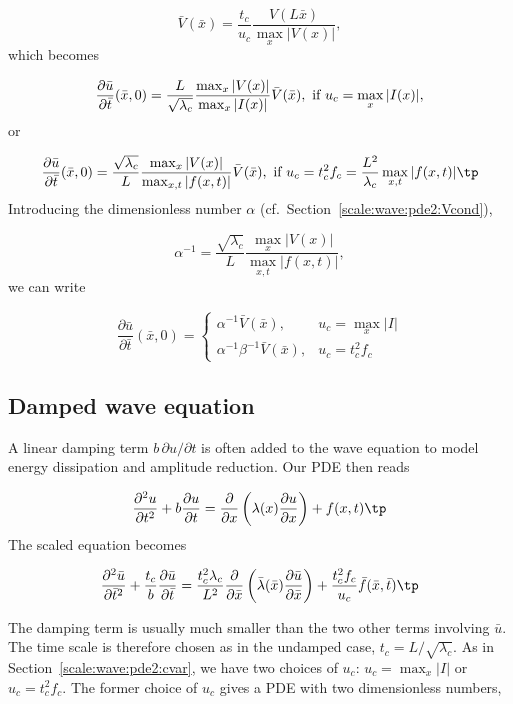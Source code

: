 \documentclass[graybox,envcountchap,sectrefs,final]{svmonodo}
\begin{document}
\[ \bar V(\bar x) = \frac{t_c}{u_c}\frac{V(L\bar x)}{\max_x|V(x)|},\]
which becomes

\[ \frac{\partial\bar u}{\partial\bar t}(\bar x, 0) =
\frac{L}{\sqrt{\lambda_c}}\frac{\max_{x}|V(x)|}{\max_{x}|I(x)|}\bar V(\bar x),
\hbox{ if } u_c=\max_x|I(x)|,\]
or

\[ \frac{\partial\bar u}{\partial\bar t}(\bar x, 0) =
\frac{\sqrt{\lambda_c}}{L}\frac{\max_{x}|V(x)|}{\max_{x,t}|f(x,t)|}
\bar V(\bar x),
\hbox{ if } u_c=t_c^2f_c=\frac{L^2}{\lambda_c}\max_{x,t}|f(x,t)|\tp\]
Introducing the dimensionless number $\alpha$ (cf.~Section~\ref{scale:wave:pde2:Vcond}),

\[ \alpha^{-1} = \frac{\sqrt{\lambda_c}}{L}\frac{\max_{x}|V(x)|}{\max_{x,t}|f(x,t)|},
\]
we can write

\[
\frac{\partial\bar u}{\partial\bar t}(\bar x, 0) =
\left\lbrace \begin{array}{ll}
\alpha^{-1}\bar V(\bar x),& u_c=\max_x|I|\\ 
\alpha^{-1}\beta^{-1}\bar V(\bar x), & u_c=t_c^2f_c
\end{array}\right.
\]

\subsection{Damped wave equation}
\label{scale:wave:pde2:damped}

A linear damping term $b\,\partial u/\partial t$ is often added to
the wave equation to model energy dissipation and amplitude reduction.
Our PDE then reads

\begin{equation}
\frac{\partial^2 u}{\partial t^2}
+ b\frac{\partial u}{\partial t} =
\frac{\partial}{\partial x}\left(
\lambda(x) {\partial u\over\partial x}\right) + f(x,t)\tp
\end{equation}
The scaled equation becomes

\[
\frac{\partial^2 \bar u}{\partial \bar t^2}
+ \frac{t_c} b\frac{\partial \bar u}{\partial \bar t} =
\frac{t_c^2\lambda_c}{L^2}\frac{\partial}{\partial \bar x}\left(
\bar \lambda(\bar x) {\partial \bar u\over\partial \bar x}\right) +
\frac{t_c^2f_c}{u_c}\bar f(\bar x,\bar t)\tp
\]

The damping term is usually much smaller than the two other terms involving
$\bar u$. The time scale is therefore chosen as in the undamped case,
$t_c=L/\sqrt{\lambda_c}$. As in Section~\ref{scale:wave:pde2:cvar},
we have two choices of $u_c$: $u_c=\max_x|I|$ or $u_c=t_c^2f_c$.
The former choice of $u_c$ gives a PDE with two dimensionless numbers,
\end{document}
